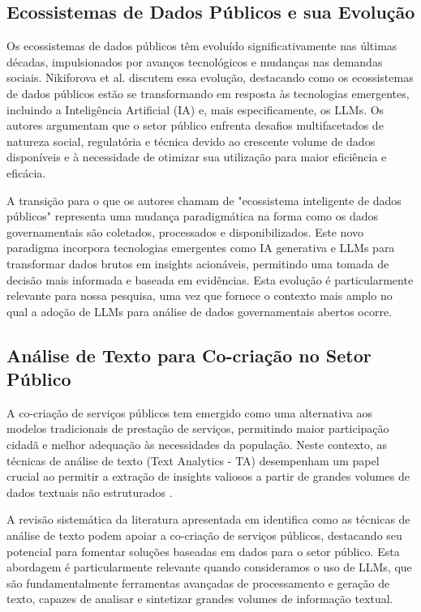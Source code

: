 \subsection{Ecossistemas de Dados Públicos e sua Evolução}

Os ecossistemas de dados públicos têm evoluído significativamente nas últimas décadas, impulsionados por avanços tecnológicos e mudanças nas demandas sociais. Nikiforova et al. \cite{ref_37} discutem essa evolução, destacando como os ecossistemas de dados públicos estão se transformando em resposta às tecnologias emergentes, incluindo a Inteligência Artificial (IA) e, mais especificamente, os LLMs. Os autores argumentam que o setor público enfrenta desafios multifacetados de natureza social, regulatória e técnica devido ao crescente volume de dados disponíveis e à necessidade de otimizar sua utilização para maior eficiência e eficácia.

A transição para o que os autores chamam de "ecossistema inteligente de dados públicos" representa uma mudança paradigmática na forma como os dados governamentais são coletados, processados e disponibilizados. Este novo paradigma incorpora tecnologias emergentes como IA generativa e LLMs para transformar dados brutos em insights acionáveis, permitindo uma tomada de decisão mais informada e baseada em evidências. Esta evolução é particularmente relevante para nossa pesquisa, uma vez que fornece o contexto mais amplo no qual a adoção de LLMs para análise de dados governamentais abertos ocorre.

\subsection{Análise de Texto para Co-criação no Setor Público}

A co-criação de serviços públicos tem emergido como uma alternativa aos modelos tradicionais de prestação de serviços, permitindo maior participação cidadã e melhor adequação às necessidades da população. Neste contexto, as técnicas de análise de texto (Text Analytics - TA) desempenham um papel crucial ao permitir a extração de insights valiosos a partir de grandes volumes de dados textuais não estruturados \cite{Rizun2025}.

A revisão sistemática da literatura apresentada em \cite{Rizun2025} identifica como as técnicas de análise de texto podem apoiar a co-criação de serviços públicos, destacando seu potencial para fomentar soluções baseadas em dados para o setor público. Esta abordagem é particularmente relevante quando consideramos o uso de LLMs, que são fundamentalmente ferramentas avançadas de processamento e geração de texto, capazes de analisar e sintetizar grandes volumes de informação textual.

